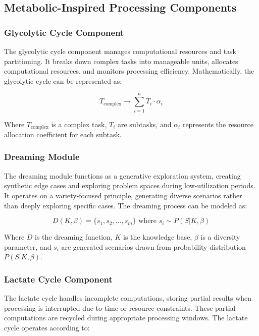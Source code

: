 \documentclass[11pt,a4paper,twocolumn]{article}
\begin{document}
\subsection{Metabolic-Inspired Processing Components}

\subsubsection{Glycolytic Cycle Component}
The glycolytic cycle component manages computational resources and task partitioning. It breaks down complex tasks into manageable units, allocates computational resources, and monitors processing efficiency. Mathematically, the glycolytic cycle can be represented as:

\begin{equation}
T_{\text{complex}} \rightarrow \sum_{i=1}^{n} T_i \cdot \alpha_i
\end{equation}

Where $T_{\text{complex}}$ is a complex task, $T_i$ are subtasks, and $\alpha_i$ represents the resource allocation coefficient for each subtask.

\subsubsection{Dreaming Module}
The dreaming module functions as a generative exploration system, creating synthetic edge cases and exploring problem spaces during low-utilization periods. It operates on a variety-focused principle, generating diverse scenarios rather than deeply exploring specific cases. The dreaming process can be modeled as:

\begin{equation}
D(K, \beta) = \{s_1, s_2, ..., s_m\} \text{ where } s_i \sim P(S|K, \beta)
\end{equation}

Where $D$ is the dreaming function, $K$ is the knowledge base, $\beta$ is a diversity parameter, and $s_i$ are generated scenarios drawn from probability distribution $P(S|K, \beta)$.

\subsubsection{Lactate Cycle Component}
The lactate cycle handles incomplete computations, storing partial results when processing is interrupted due to time or resource constraints. These partial computations are recycled during appropriate processing windows. The lactate cycle operates according to:
\end{document}
